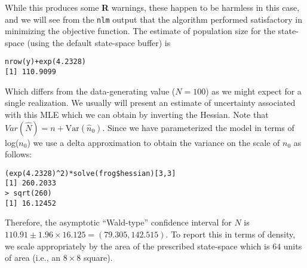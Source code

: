 While this produces some {\bf R} warnings, these happen to be harmless
in this case, and we will see from the \mbox{\tt nlm} output that the
algorithm performed satisfactory in minimizing the objective function.
The estimate of population size for the state-space (using the default 
state-space buffer) is
\begin{verbatim}
nrow(y)+exp(4.2328)
[1] 110.9099
\end{verbatim}
Which differs from the data-generating value ($N=100$) as we might
expect for a single realization. We usually will present an estimate of uncertainty associated
with this MLE which we can obtain by inverting the Hessian. Note that
$Var(\hat{N}) = n + \mbox{Var}(\hat{n}_{0})$.
Since we
have parameterized the model in terms of log($n_{0}$) we use a delta
approximation to obtain the variance on the scale of $n_{0}$ as
follows:
\begin{verbatim}
(exp(4.2328)^2)*solve(frog$hessian)[3,3]
[1] 260.2033
> sqrt(260)
[1] 16.12452
\end{verbatim}
Therefore, the asymptotic ``Wald-type'' confidence interval for $N$ is
$110.91 \pm 1.96 \times 16.125 = (79.305, 142.515)$. To report this in
terms of density, we scale appropriately by the area of the prescribed
state-space which is $64$ units of area (i.e., an $8 \times 8$ square).


\begin{comment}

\subsection{Exercises}

{\flushleft 
{\bf 1.}	
Run the analysis with different state-space buffers and comment on the result. 
}


{\flushleft 
{\bf 2.} Conduct a brief simulation study using this code by
  simulating 100 data sets and obtain the MLEs for each data set. Do
  things seem to be working as you expect?  }

{\flushleft 
{\bf 3.} 
Further extensions: It should be straightforward to
  generalize the integrated likelihood function to accommodate many
  different situations. For examples, if we want to include more
  covariates in the model we can just add stuff to the object \mbox{\tt probcap},
 and add the relevant parameters to the argument that gets
  passed to the main  function.  For the simulated data, make up a
  covariate by generating a Bernoulli covariate (``trap type'' – perhaps
  baited or not baited) randomly and try to modify the likelihood to
  accommodate that.  }

{\flushleft {\bf 4.}  We would probably be interested in devising the
  integrated likelihood for the full 3-d encounter history array so
  that we could include temporally varying covariates. This is not
  difficult but naturally will slow down the execution
  substantially. The interested reader should try to expand the
  capabilities of this basic {\bf R} function.  }
\end{comment}




